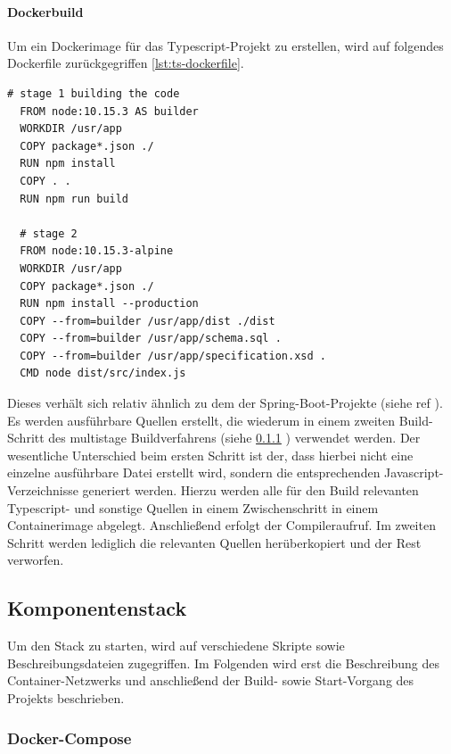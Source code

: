 \paragraph{Dockerbuild \checkmark}
Um ein Dockerimage für das Typescript-Projekt zu erstellen, wird auf folgendes Dockerfile zurückgegriffen \ref{lst:ts-dockerfile}.

\begin{lstlisting}[style=bashStyle,caption={Dockerfile - Typescript Projekt},label=lst:ts-dockerfile]
  # stage 1 building the code
  FROM node:10.15.3 AS builder
  WORKDIR /usr/app
  COPY package*.json ./
  RUN npm install
  COPY . .
  RUN npm run build 

  # stage 2
  FROM node:10.15.3-alpine
  WORKDIR /usr/app
  COPY package*.json ./
  RUN npm install --production
  COPY --from=builder /usr/app/dist ./dist
  COPY --from=builder /usr/app/schema.sql .
  COPY --from=builder /usr/app/specification.xsd .
  CMD node dist/src/index.js
\end{lstlisting}

Dieses verhält sich relativ ähnlich zu dem der Spring-Boot-Projekte (siehe ref{} ). Es werden ausführbare Quellen erstellt, die wiederum in einem zweiten Build-Schritt des multistage Buildverfahrens (siehe \ref{} ) verwendet werden. Der wesentliche Unterschied beim ersten Schritt ist der, dass hierbei nicht eine einzelne ausführbare Datei erstellt wird, sondern die entsprechenden Javascript-Verzeichnisse generiert werden. Hierzu werden alle für den Build relevanten Typescript- und sonstige Quellen in einem Zwischenschritt in einem Containerimage abgelegt. Anschließend erfolgt der Compileraufruf. Im zweiten Schritt werden lediglich die relevanten Quellen herüberkopiert und der Rest verworfen. 


\subsection{Komponentenstack \checkmark}
Um den Stack zu starten, wird auf verschiedene Skripte sowie Beschreibungsdateien zugegriffen. Im Folgenden wird erst die Beschreibung des Container-Netzwerks und anschließend der Build- sowie Start-Vorgang des Projekts beschrieben.

\subsubsection{Docker-Compose \checkmark}
